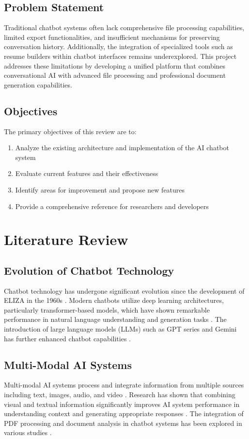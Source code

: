\documentclass[conference]{IEEEtran}
\begin{document}
\subsection{Problem Statement}
Traditional chatbot systems often lack comprehensive file processing capabilities, limited export functionalities, and insufficient mechanisms for preserving conversation history. Additionally, the integration of specialized tools such as resume builders within chatbot interfaces remains underexplored. This project addresses these limitations by developing a unified platform that combines conversational AI with advanced file processing and professional document generation capabilities.

\subsection{Objectives}
The primary objectives of this review are to:
\begin{enumerate}[itemsep=0pt, parsep=0pt]
    \item Analyze the existing architecture and implementation of the AI chatbot system
    \item Evaluate current features and their effectiveness
    \item Identify areas for improvement and propose new features
    \item Provide a comprehensive reference for researchers and developers
\end{enumerate}

\section{Literature Review}

\subsection{Evolution of Chatbot Technology}
Chatbot technology has undergone significant evolution since the development of ELIZA in the 1960s \cite{weizenbaum1966}. Modern chatbots utilize deep learning architectures, particularly transformer-based models, which have shown remarkable performance in natural language understanding and generation tasks \cite{vaswani2017}. The introduction of large language models (LLMs) such as GPT series and Gemini has further enhanced chatbot capabilities \cite{thoppilan2022}.

\subsection{Multi-Modal AI Systems}
Multi-modal AI systems process and integrate information from multiple sources including text, images, audio, and video \cite{baltrusaitis2019}. Research has shown that combining visual and textual information significantly improves AI system performance in understanding context and generating appropriate responses \cite{lu2019}. The integration of PDF processing and document analysis in chatbot systems has been explored in various studies \cite{devlin2018}.
\end{document}
